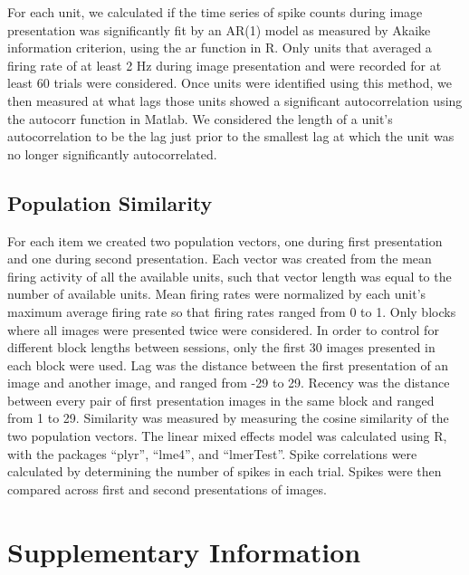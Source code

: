 \documentclass{apa}
\begin{document}
For each unit, we calculated if the time series of spike counts during image presentation 
was significantly fit by an AR(1) model as measured by Akaike information criterion, using the
ar function in R. Only units that averaged a firing rate of at least 2 Hz during image presentation 
and were recorded for at least 60 trials were considered.
Once units were identified using this method, we then measured at what lags
those units showed a significant autocorrelation using the autocorr function in Matlab. We
considered the length of a unit's autocorrelation to be the lag just prior to the smallest lag 
at which the unit was no longer significantly autocorrelated.

\subsection{Population Similarity}

For each item we created two population vectors, one during first
presentation and one during second presentation. Each vector was created from
the mean firing activity of all the available units, such that vector length
was equal to the number of available units. Mean firing rates were normalized
by each unit's maximum average firing rate so that firing rates ranged from 0
to 1. Only blocks where all images were presented twice were considered. In
order to control for different block lengths between sessions, only the first
30 images presented in each block were used. Lag was the distance between the
first presentation of an image and another image, and ranged from -29 to 29.
Recency was the distance between every pair of first presentation images in
the same block and ranged from 1 to 29. Similarity was measured by measuring
the cosine similarity of the two population vectors. The linear mixed effects
model was calculated using R, with the packages ``plyr'', ``lme4'', and
``lmerTest''. Spike correlations were calculated by determining the number of
spikes in each trial. Spikes were then compared across first and second
presentations of images.

\nocite{Wick11,KuznEtal17,BateEtal14}


\clearpage

\setcounter{figure}{0}
\renewcommand{\thefigure}{S\arabic{figure}}

\setcounter{equation}{0}
\renewcommand{\theequation}{S\arabic{equation}}


\section{Supplementary Information}
\end{document}
